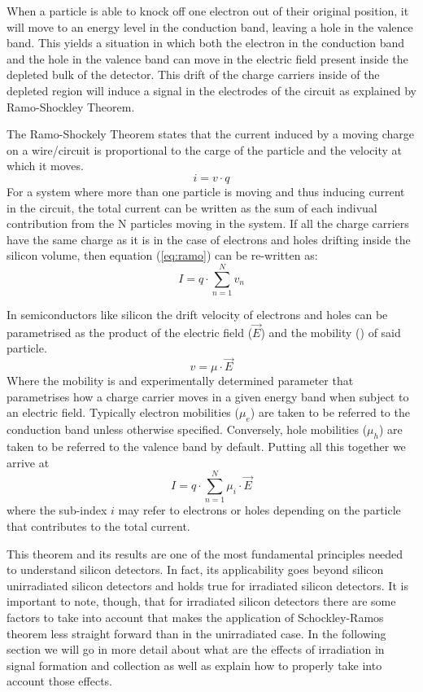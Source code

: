 When a particle is able to knock off one electron out of their original position, it will move to an energy level in the conduction band, leaving a hole in the valence band. This yields a situation in which both the electron in the conduction band and the hole in the valence band can move in the electric field present inside the depleted bulk of the detector. This drift of the charge carriers inside of the depleted region will induce a signal in the electrodes of the circuit as explained by Ramo-Shockley Theorem.

The Ramo-Shockely Theorem states that the current induced by a moving charge on a wire/circuit is proportional to the carge of the particle and the velocity at which it moves. 
\begin{equation}
	i = v \cdot q
	\label{eq:ramo} 
\end{equation} 
For a system where more than one particle is moving and thus inducing current in the circuit, the total current can be written as the sum of each indivual contribution from the N particles moving in the system. If all the charge carriers have the same charge as it is in the case of electrons and holes drifting inside the silicon volume, then equation (\ref{eq:ramo}) can be re-written as:
\begin{equation}
	I = q \cdot \sum_{n=1}^{N} v_n 	\label{eq:ramoTot} 
\end{equation} 

In semiconductors like silicon the drift velocity of electrons and holes can be parametrised as the product of the electric field ($ \vec E $) and the mobility (\mu) of said particle.\[v = \mu \cdot \vec E\] Where the mobility is and experimentally determined parameter that parametrises how a charge carrier moves in a given energy band when subject to an electric field. Typically electron mobilities ($ \mu_e $) are taken to be referred to the conduction band unless otherwise specified. Conversely, hole mobilities ($ \mu_h $) are taken to be referred to the valence band by default. Putting all this together we arrive at
\begin{equation}
	I = q \cdot \sum_{n=1}^{N} \mu_i \cdot \vec{E} 
\label{eq:ramoMob}
\end{equation}
where the sub-index $i$ may refer to electrons or holes depending on the particle that contributes to the total current.

This theorem and its results are one of the most fundamental principles needed to understand silicon detectors. In fact, its applicability goes beyond silicon unirradiated silicon detectors and holds true for irradiated silicon detectors. It is important to note, though, that for irradiated silicon detectors there are some factors to take into account that makes the application of Schockley-Ramos theorem less straight forward than in the unirradiated case. In the following section we will go in more detail about what are the effects of irradiation in signal formation and collection as well as explain how to properly take into account those effects.
